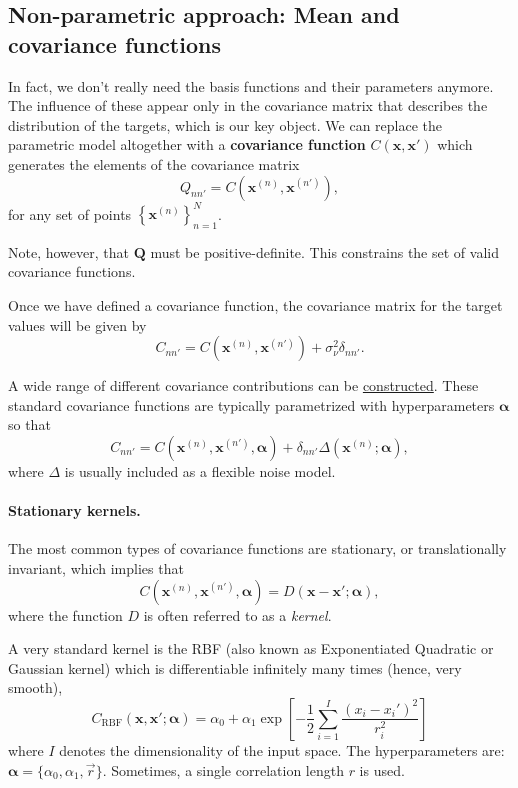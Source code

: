 \documentclass[%
oneside,                 %
final,                   %
10pt]{article}
\begin{document}
\subsection{Non-parametric approach: Mean and covariance functions}

In fact, we don't really need the basis functions and their parameters anymore. The influence of these appear only in the covariance matrix that describes the distribution of the targets, which is our key object. We can replace the parametric model altogether with a \textbf{covariance function} $C( \boldsymbol{x}, \boldsymbol{x}' )$ which generates the  elements of the covariance matrix
\[
Q_{nn'} = C \left( \boldsymbol{x}^{(n)}, \boldsymbol{x}^{(n')} \right),
\]
for any set of points $\left\{ \boldsymbol{x}^{(n)} \right\}_{n=1}^N$.

Note, however, that $\boldsymbol{Q}$ must be positive-definite. This constrains the set of valid covariance functions.

Once we have defined a covariance function, the covariance matrix for the target values will be given by
\[
C_{nn'} = C \left( \boldsymbol{x}^{(n)}, \boldsymbol{x}^{(n')} \right) + \sigma_\nu^2 \delta_{nn'}.
\]

A wide range of different covariance contributions can be \href{{https://en.wikipedia.org/wiki/Gaussian_process#Covariance_functions}}{constructed}. These standard covariance functions are typically parametrized with hyperparameters $\boldsymbol{\alpha}$ so that 
\[
C_{nn'} = C \left( \boldsymbol{x}^{(n)}, \boldsymbol{x}^{(n')}, \boldsymbol{\alpha} \right) + \delta_{nn'} \Delta \left( \boldsymbol{x}^{(n)};  \boldsymbol{\alpha} \right),
\]
where $\Delta$ is usually included as a flexible noise model.

\paragraph{Stationary kernels.}
The most common types of covariance functions are stationary, or translationally invariant, which implies that 
\[
C \left( \boldsymbol{x}^{(n)}, \boldsymbol{x}^{(n')}, \boldsymbol{\alpha} \right) = D \left( \boldsymbol{x} - \boldsymbol{x}'; \boldsymbol{\alpha} \right),
\]
where the function $D$ is often referred to as a \emph{kernel}.

A very standard kernel is the RBF (also known as Exponentiated Quadratic or Gaussian kernel) which is differentiable infinitely many times (hence, very smooth),
\[ 
C_\mathrm{RBF}(\mathbf{x},\mathbf{x}'; \boldsymbol{\alpha}) = \alpha_0 + \alpha_1 \exp \left[ -\frac{1}{2} \sum_{i=1}^I \frac{(x_{i} - x_{i}')^2}{r_i^2} \right] 
\]
where $I$ denotes the dimensionality of the input space. The hyperparameters are: $\boldsymbol{\alpha} = \{ \alpha_0, \alpha_1, \vec{r} \}$. Sometimes, a single correlation length $r$ is used.
\end{document}
